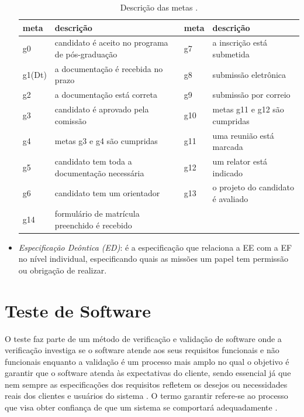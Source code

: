 \begin{itemize}
\begin{table}[ht]
\footnotesize
\centering
\caption{Descrição das metas \cite{hubner2003modelo}.}
\label{tab:desc_metas}
\begin{tabular}{@{}llll@{}}
\toprule
meta   & \multicolumn{1}{l|}{descrição}                                       & meta & descrição                         \\ \midrule
g0     & \multicolumn{1}{l|}{candidato é aceito no programa de pós-graduação} & g7   & a inscrição está submetida        \\
g1(Dt) & \multicolumn{1}{l|}{a documentação é recebida no prazo}              & g8   & submissão eletrônica              \\
g2     & \multicolumn{1}{l|}{a documentação está correta}                     & g9   & submissão por correio             \\
g3     & \multicolumn{1}{l|}{candidato é aprovado pela comissão}              & g10  & metas g11 e g12 são cumpridas          \\
g4     & \multicolumn{1}{l|}{metas g3 e g4 são cumpridas}                                                & g11  & uma reunião está marcada          \\
g5     & \multicolumn{1}{l|}{candidato tem toda a documentação necessária}    & g12  & um relator está indicado          \\
g6     & \multicolumn{1}{l|}{candidato tem um orientador}                     & g13  & o projeto do candidato é avaliado \\
g14    & formulário de matrícula preenchido é recebido                        &      &                                   \\ \bottomrule
\end{tabular}
\end{table}

\item {\it Especificação Deôntica (ED)}: é a especificação que relaciona a EE com a EF no nível individual, especificando quais as missões um papel tem permissão ou obrigação de realizar.

\end{itemize}

\section{Teste de Software}

O teste faz parte de um método de verificação e validação de software onde a verificação investiga se o software atende aos seus requisitos funcionais e não funcionais enquanto a validação é um processo mais amplo no qual o objetivo é garantir que o software atenda às expectativas do cliente, sendo essencial já que nem sempre as especificações dos requisitos refletem os desejos ou necessidades reais dos clientes e usuários do sistema \cite{sommerville2010}. O termo garantir refere-se ao processo que visa obter confiança de que um sistema se comportará adequadamente \cite{winikoff2010assurance}. 

